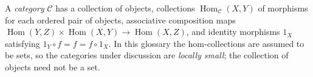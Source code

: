 
A \emph{category} $\mathcal C$ has a collection of objects, collections $\operatorname{Hom}_{\mathcal C}(X,Y)$ of morphisms for each ordered pair of objects, associative composition maps $\operatorname{Hom}(Y,Z)\times\operatorname{Hom}(X,Y)\to\operatorname{Hom}(X,Z)$, and identity morphisms $1_X$ satisfying $1_Y\circ f=f=f\circ1_X$. In this glossary the hom-collections are assumed to be sets, so the categories under discussion are \emph{locally small}; the collection of objects need not be a set.
